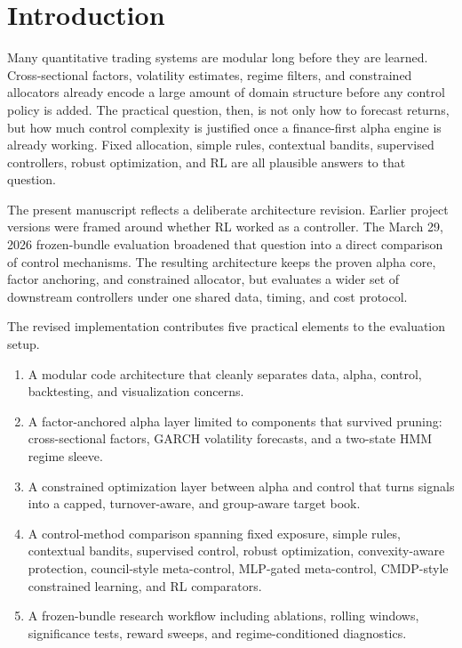 \documentclass[10pt,twocolumn]{article}
\begin{document}
\section{Introduction}

Many quantitative trading systems are modular long before they are learned.
Cross-sectional factors, volatility estimates, regime filters, and constrained
allocators already encode a large amount of domain structure before any control
policy is added. The practical question, then, is not only how to forecast
returns, but how much control complexity is justified once a finance-first
alpha engine is already working. Fixed allocation, simple rules, contextual
bandits, supervised controllers, robust optimization, and RL are all plausible
answers to that question.

The present manuscript reflects a deliberate architecture revision. Earlier
project versions were framed around whether RL worked as a controller. The
March 29, 2026 frozen-bundle evaluation broadened that question into a direct
comparison of control mechanisms. The resulting architecture keeps the proven
alpha core, factor anchoring, and constrained allocator, but evaluates a wider
set of downstream controllers under one shared data, timing, and cost protocol.

The revised implementation contributes five practical elements to the evaluation
setup.
\begin{enumerate}[leftmargin=1.5em, itemsep=2pt, topsep=4pt]
\item A modular code architecture that cleanly separates data, alpha, control,
      backtesting, and visualization concerns.
\item A factor-anchored alpha layer limited to components that survived pruning:
      cross-sectional factors, GARCH volatility forecasts, and a two-state HMM
      regime sleeve.
\item A constrained optimization layer between alpha and control that turns
      signals into a capped, turnover-aware, and group-aware target book.
\item A control-method comparison spanning fixed exposure, simple rules,
      contextual bandits, supervised control, robust optimization,
      convexity-aware protection, council-style meta-control, MLP-gated
      meta-control, CMDP-style constrained learning, and RL comparators.
\item A frozen-bundle research workflow including ablations, rolling windows,
      significance tests, reward sweeps, and regime-conditioned diagnostics.
\end{enumerate}
\end{document}
